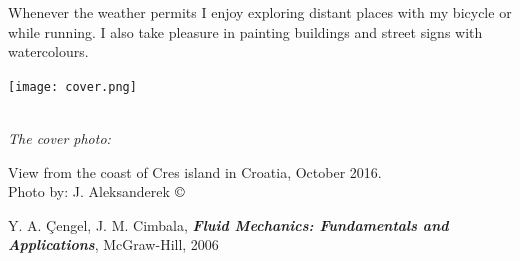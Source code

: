 \documentclass[10pt]{report}
\begin{document}
Whenever the weather permits I enjoy exploring distant places with my bicycle or while running. I also take pleasure in painting buildings and street signs with watercolours.

\begin{flushright}


\texttt{[image: cover.png]}

\setlength{\parskip}{0.1em}
\setlength{\parindent}{0cm}
\ \\[0.5cm]
\textit{The cover photo:}  

View from the coast of Cres island in Croatia, October 2016.
\ \\[0.1cm]
Photo by: J. Aleksanderek $\copyright$
\end{flushright}




\begin{thebibliography}{50}

\item Y. A. Çengel, J. M. Cimbala, \textbf{\textit{Fluid Mechanics: Fundamentals and Applications}}, McGraw-Hill, 2006
\item
\item
\item
\item
\item 

\item 
\item
\item
\item
\item
\item 

\item 
\item
\item
\item
\item
\item 
\thispagestyle{empty}
\end{thebibliography}
\end{document}
